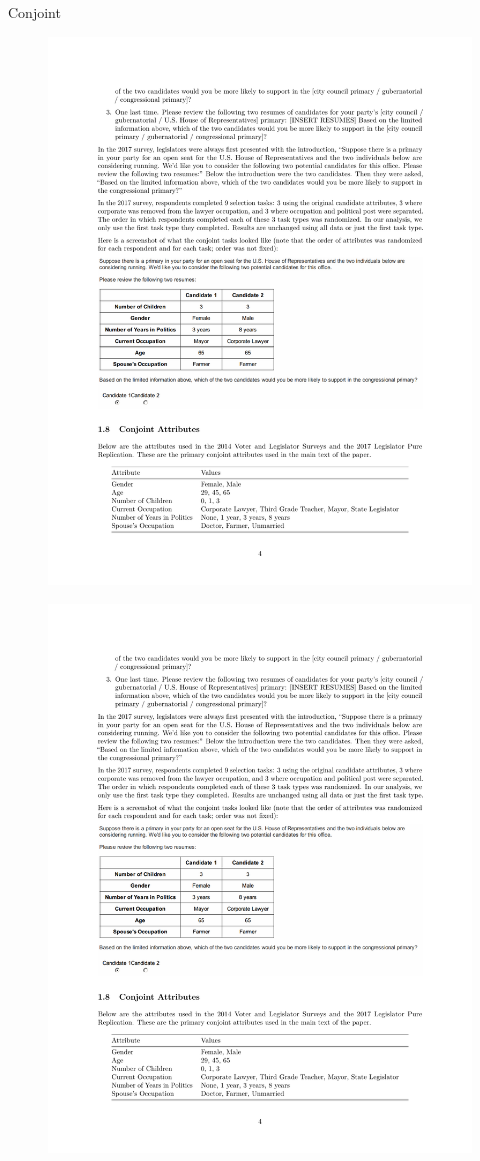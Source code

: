 \documentclass[
  ignorenonframetext,
]{beamer}
\begin{document}
\begin{frame}{Conjoint}
\protect\hypertarget{conjoint}{}
\begin{figure}

{\centering \includegraphics[width=0.8\linewidth]{./figs/survey-exp-teele-2018} 

}

\end{figure}

\begin{figure}

{\centering \includegraphics[width=0.8\linewidth]{./figs/survey-exp-teele-2018-conjoint-attributes} 

}
\end{figure}
\end{frame}
\end{document}
